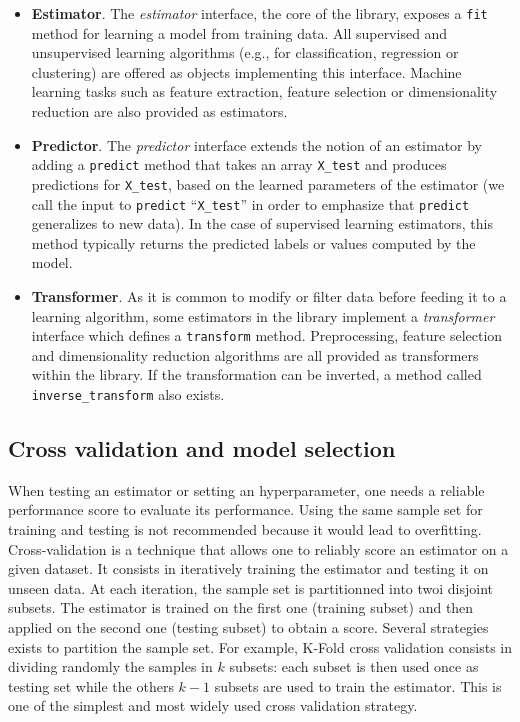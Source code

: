 \documentclass{frontiersSCNS} %
\begin{document}
\begin{itemize}
\item {\bf Estimator}. The \textit{estimator} interface, the core of the
    library, exposes a \texttt{fit} method for learning a model from training data.
    All supervised
    and unsupervised learning algorithms (e.g., for classification, regression or
    clustering) are offered as objects implementing this interface. Machine
    learning tasks such as feature extraction, feature selection or dimensionality
    reduction are also provided as estimators.

\item {\bf Predictor}. The \textit{predictor} interface extends the notion of an estimator
    by adding a \texttt{predict}
    method that takes an array \texttt{X\_test} and produces
    predictions for \texttt{X\_test}, based on the learned parameters of the
    estimator (we call the input to \texttt{predict} ``\texttt{X\_test}'' in order
    to emphasize that \texttt{predict} generalizes to new data). In the case of
    supervised learning estimators, this method typically returns the predicted
    labels or values computed by the model.

\item {\bf Transformer}. As it is common to modify or filter data before feeding it to a learning
    algorithm, some estimators in the library implement a \textit{transformer}
    interface which defines a \texttt{transform} method. Preprocessing, feature selection and
    dimensionality reduction
    algorithms are all provided as transformers within the library. If the transformation
    can be inverted, a method called \verb!inverse_transform! also exists.

\end{itemize}

\subsection{Cross validation and model selection}

When testing an estimator or setting an hyperparameter, one needs a reliable
performance score to evaluate its performance. Using the same
sample set for training and testing is not recommended because it would lead to
overfitting.
Cross-validation is a technique that allows one to reliably score an
estimator on a given dataset. It consists in iteratively training the
estimator and testing it on unseen data.
At each iteration, the sample set is partitionned into twoi disjoint subsets. The estimator
is trained on the first one (training subset) and then applied on the second
one (testing subset) to obtain a score.
Several strategies exists to partition the sample set.
For example, K-Fold cross validation consists in dividing randomly the samples in $k$
subsets: each subset is then used once as testing set while the others $k - 1$
subsets are used to train the estimator. This is one of the simplest and most
widely used cross validation strategy.
\end{document}
